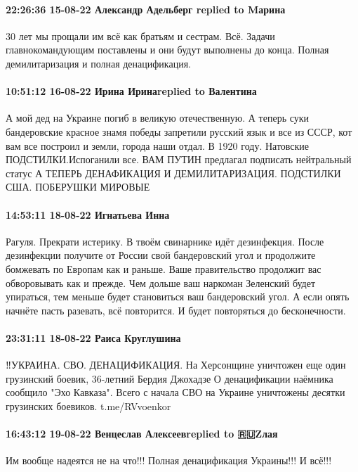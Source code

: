  
 
 
 
 

\paragraph{22:26:36 15-08-22 Александр Адельберг replied to Mарина}

30 лет мы прощали им всё как братьям и сестрам. Всё. Задачи главнокомандующим
поставлены и они будут выполнены до конца.
Полная демилитаризация и полная денацификация.

\paragraph{10:51:12 16-08-22 Ирина Иринаreplied to Валентина}

\obeycr
А мой дед на Украине погиб в великую отечественную.
А теперь суки бандеровские красное знамя победы запретили русский язык и все из СССР, кот вам все построил и земли, города наши отдал. В 1920 году.
Натовские ПОДСТИЛКИ.Испоганили все.
ВАМ ПУТИН предлагал подписать нейтральный статус
А ТЕПЕРЬ ДЕНАФИКАЦИЯ И ДЕМИЛИТАРИЗАЦИЯ.
ПОДСТИЛКИ США.
ПОБЕРУШКИ МИРОВЫЕ
\restorecr

\paragraph{14:53:11 18-08-22 Игнатьева Инна}

Рагуля. Прекрати истерику. В твоём свинарнике идёт дезинфекция.  После
дезинфекции получите от России свой бандеровский угол и продолжите бомжевать по
Европам как и раньше.  Ваше правительство продолжит вас обворовывать как и
прежде.  Чем дольше ваш наркоман Зеленский будет упираться, тем меньше будет
становиться ваш бандеровский угол.  А если опять начнёте пасть разевать, всё
повторится. И будет повторяться до бесконечности. 

\paragraph{23:31:11 18-08-22 Раиса Круглушина}

‼УКРАИНА. СВО. ДЕНАЦИФИКАЦИЯ. На Херсонщине уничтожен еще один грузинский боевик, 36-летний Бердия Джохадзе
О денацификации наёмника сообщило "Эхо Кавказа". Всего с начала СВО на Украине уничтожены десятки грузинских боевиков. t.me/RVvoenkor

\paragraph{16:43:12 19-08-22 Венцеслав Алексеевreplied to 🇷🇺Zлая}

Им вообще надеятся не на что!!! Полная денацификация Украины!!! И всё!!!
